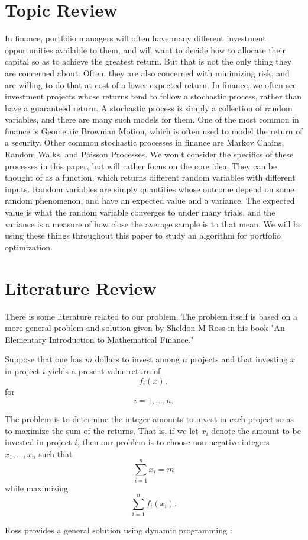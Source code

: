 \documentclass{article}
\begin{document}
\section{Topic Review}
In finance, portfolio managers will often have many different investment opportunities available to them, and will want to decide how to allocate their capital so as to achieve the greatest return.  But that is not the only thing they are concerned about.  Often, they are also concerned with minimizing risk, and are willing to do that at cost of a lower expected return. In finance, we often see investment projects whose returns tend to follow a stochastic process, rather than have a guaranteed return.  A stochastic process is simply a collection of random variables, and there are many such models for them.  One of the most common in finance is Geometric Brownian Motion, which is often used to model the return of a security.  Other common stochastic processes in finance are Markov Chains, Random Walks, and Poisson Processes.  We won't consider the specifics of these processes in this paper, but will rather focus on the core idea.  They can be thought of as a function, which returns different random variables with different inputs.  Random variables are simply quantities whose outcome depend on some random phenomenon, and have an expected value and a variance.  The expected value is what the random variable converges to under many trials, and the variance is a measure of how close the average sample is to that mean.  We will be using these things throughout this paper to study an algorithm for portfolio optimization.  

\pagebreak
\section{Literature Review}
\par
There is some literature related to our problem.  The problem itself is based on a more general problem and solution given by Sheldon M Ross \cite{Ross} in his book "An Elementary Introduction to Mathematical Finance."
\par
Suppose that one has $m$ dollars to invest among $n$ projects and that investing $x$ in project $i$ yields a present value return of $$f_{i}(x),$$ for $$i = 1, ..., n.$$ \par The problem is to determine the integer amounts to invest in each project so as to maximize the sum of the returns.  That is, if we let $x_{i}$ denote the amount to be invested in project $i$, then our problem is to choose non-negative integers $x_{1}, ..., x_{n}$ such that $$\sum_{i=1}^{n}x_{i} = m$$ while maximizing $$\sum_{i=1}^{n} f_{i}(x_{i}).$$
\newline
\par
Ross provides a general solution using dynamic programming \cite{Ross}:
\end{document}
